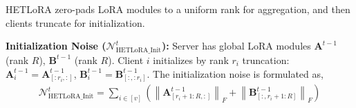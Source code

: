 \documentclass{article} %
\newcommand{\mat}[1]{\mathbf{#1}}
\begin{document}

HETLoRA zero-pads LoRA modules to a uniform rank for aggregation, and then clients truncate for initialization.

\textbf{Initialization Noise ($\mathcal{N}_{\text{HETLoRA\_Init}}^{t}$):} Server has global LoRA modules $\mat{A}^{t-1}$ (rank $R$), $\mat{B}^{t-1}$ (rank $R$). Client $i$ initializes by rank $r_i$ truncation:
$\mat{A}_i^{t-1} = \mat{A}^{t-1}_{[:r_i, :]}$, $\mat{B}_i^{t-1} = \mat{B}^{t-1}_{[:, :r_i]}$.
The initialization noise is formulated as,
\begin{align*}
\mathcal{N}_{\text{HETLoRA\_Init}}^{t} = \sum_{i\in[v]} \left( \left\| \mat{A}^{t-1}_{[r_i+1:R, :]} \right\|_F + \left\| \mat{B}^{t-1}_{[:, r_i+1:R]} \right\|_F \right)
\end{align*}
\end{document}

